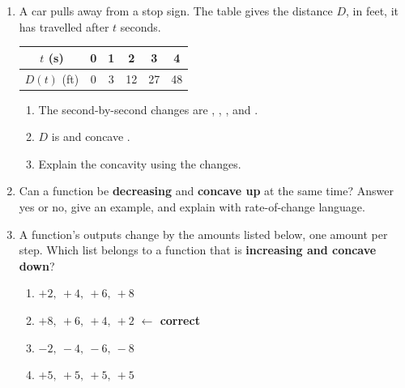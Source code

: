 \documentclass[10pt]{article}
\begin{document}
\begin{enumerate}[itemsep=10pt]
\item A car pulls away from a stop sign. The table gives the distance $D$, in
      feet, it has travelled after $t$ seconds.

\smallskip
\renewcommand{\arraystretch}{1.4}
\begin{tabular}{|c|c|c|c|c|c|}
\hline
$t$ (s) & 0 & 1 & 2 & 3 & 4 \\
\hline
$D(t)$ (ft) & 0 & 3 & 12 & 27 & 48 \\
\hline
\end{tabular}
\smallskip

\begin{enumerate}[label=(\alph*), itemsep=4pt]
  \item The second-by-second changes are , , ,
        and .
  \item $D$ is  and concave .
  \item Explain the concavity using the changes.

        \vspace{0.05in}
\end{enumerate}

\item Can a function be \textbf{decreasing} and \textbf{concave up} at the same
      time? Answer yes or no, give an example, and explain with rate-of-change
      language.

\vspace{0.05in}

\item A function's outputs change by the amounts listed below, one amount per
      step. Which list belongs to a function that is \textbf{increasing and
      concave down}?

\begin{enumerate}[label=\Alph*., itemsep=3pt]
  \item $+2,\ +4,\ +6,\ +8$
  \item $+8,\ +6,\ +4,\ +2$ \quad \textcolor{keyred}{\textbf{$\leftarrow$ correct}}
  \item $-2,\ -4,\ -6,\ -8$
  \item $+5,\ +5,\ +5,\ +5$
\end{enumerate}

\end{enumerate}
\end{document}
